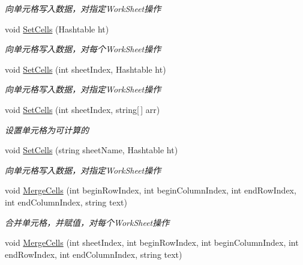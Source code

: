 \begin{DoxyCompactItemize}
\begin{DoxyCompactList}\small\item\em 向单元格写入数据，对指定\+Work\+Sheet操作 \end{DoxyCompactList}\item 
void \hyperlink{class_x_c_l_net_tools_1_1_office_1_1_excel_handler_1_1_excel_helper_acd5e584cc8280620cd132f2e92a2c464}{Set\+Cells} (Hashtable ht)
\begin{DoxyCompactList}\small\item\em 向单元格写入数据，对每个\+Work\+Sheet操作 \end{DoxyCompactList}\item 
void \hyperlink{class_x_c_l_net_tools_1_1_office_1_1_excel_handler_1_1_excel_helper_a3f5cd938e43939ab228512488ee5c843}{Set\+Cells} (int sheet\+Index, Hashtable ht)
\begin{DoxyCompactList}\small\item\em 向单元格写入数据，对指定\+Work\+Sheet操作 \end{DoxyCompactList}\item 
void \hyperlink{class_x_c_l_net_tools_1_1_office_1_1_excel_handler_1_1_excel_helper_adc471403ad84fed9a9cadbc25eda8ecf}{Set\+Cells} (int sheet\+Index, string\mbox{[}$\,$\mbox{]} arr)
\begin{DoxyCompactList}\small\item\em 设置单元格为可计算的 \end{DoxyCompactList}\item 
void \hyperlink{class_x_c_l_net_tools_1_1_office_1_1_excel_handler_1_1_excel_helper_a252fb1aa0a592429ffa639943ef6752f}{Set\+Cells} (string sheet\+Name, Hashtable ht)
\begin{DoxyCompactList}\small\item\em 向单元格写入数据，对指定\+Work\+Sheet操作 \end{DoxyCompactList}\item 
void \hyperlink{class_x_c_l_net_tools_1_1_office_1_1_excel_handler_1_1_excel_helper_a7602a33dbb3ee6cfbbf4a66e6106bd78}{Merge\+Cells} (int begin\+Row\+Index, int begin\+Column\+Index, int end\+Row\+Index, int end\+Column\+Index, string text)
\begin{DoxyCompactList}\small\item\em 合并单元格，并赋值，对每个\+Work\+Sheet操作 \end{DoxyCompactList}\item 
void \hyperlink{class_x_c_l_net_tools_1_1_office_1_1_excel_handler_1_1_excel_helper_a6285e410acdeec87d53f8720b1366d2a}{Merge\+Cells} (int sheet\+Index, int begin\+Row\+Index, int begin\+Column\+Index, int end\+Row\+Index, int end\+Column\+Index, string text)

\end{DoxyCompactItemize}
